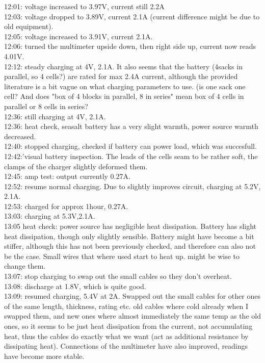 12:01: voltage increased to 3.97V, current still 2.2A\\
12:03: voltage dropped to 3.89V, current 2.1A (current difference might be due to old equipment).\\
12:05: voltage increased to 3.91V, current 2.1A.\\
12:06: turned the multimeter upside down, then right side up, current now reads 4.01V.\\
12:12: steady charging at 4V, 2.1A. It also seems that the battery (4sacks in parallel, so 4 cells?) are rated for max 2.4A current, although the provided literature is a bit vague on what charging parameters to use. (is one sack one cell? And does "box of 4 blocks in parallel, 8 in series" mean box of 4 cells in parallel or 8 cells in series?\\
12:36: still charging at 4V, 2.1A.\\
12:36: heat check, seasalt battery has a very slight warmth, power source warmth decreased.\\
12:40: stopped charging, checked if battery can power load, which was succesfull.\\
12:42:'visual battery inspection. The leads of the cells seam to be rather soft, the clamps of the charger slightly deformed them.\\
12:45: amp test: output currently 0.27A.\\
12:52: resume normal charging. Due to slightly improves circuit, charging at 5.2V, 2.1A.\\
12:53: charged for approx 1hour, 0.27A.\\
13:03: charging at 5.3V,2.1A.\\
13:05 heat check: power source has negligible heat dissipation. Battery has slight heat dissipation, though only slightly sensible. Battery might have become a bit stiffer, although this has not been previously checked, and therefore can also not be the case. Small wires that where used start to heat up. might be wise to change them.\\
13:07: stop charging to swap out the small cables so they don't overheat.\\
13:08: discharge at 1.8V, which is quite good.\\
13:09: resumed charging, 5.4V at 2A. Swapped out the small cables for other ones of the same length, thickness, rating etc. old cables where cold already when I swapped them, and new ones where almost immediately the same temp as the old ones, so it seems to be just heat dissipation from the current, not accumulating heat, thus the cables do exactly what we want (act as additional resistance by dissipating heat). Connections of the multimeter have also improved, readings have become more stable.\\
